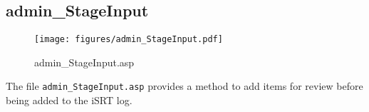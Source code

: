 \subsection{admin\_StageInput}
\begin{figure}[htb]
    \begin{center}
        \texttt{[image: figures/admin\_StageInput.pdf]}
    \end{center}
    \caption{admin\_StageInput.asp}
    \label{fig:admin_StageInput}
\end{figure}

The file \verb|admin_StageInput.asp| provides a method to add items for review
before being added to the iSRT log.
